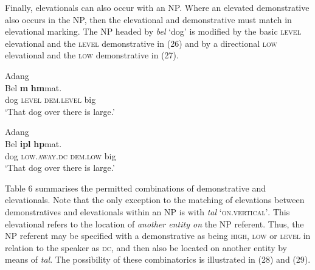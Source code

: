 Finally, elevationals can also occur with an NP. Where an elevated demonstrative also occurs in the NP, then the elevational and demonstrative must match in elevational marking. The NP headed by \textit{bel} `dog' is modified by the basic \textsc{level} elevational and the \textsc{level} demonstrative in (26) and by a directional \textsc{low} elevational and the \textsc{low} demonstrative in (27).



\ea%
\label{ex:26}
   Adang \citep[188]{Haan2001}   \\
\gll Bel  \textbf{{m}}\textbf{{{\textopeno}}}\textbf{{{\ng}}}  \textbf{{h}}\textbf{{{\textepsilon}}}\textbf{{m}}\textbf{{{\textopeno}}}{mat}{{\textepsilon}.}  \\
  dog  \textsc{level} \textsc{dem.level} big      \\
\glt   `That dog over there is large.'
\z








\ea%
\label{ex:27}
    Adang \citep[188]{Haan2001}  \\
\gll   Bel  \textbf{{ipl}}\textbf{{{\textepsilon}}} \textbf{{h}}\textbf{{{\textepsilon}p{\textopeno}}}{mat}{{\textepsilon}.} \\
    dog  \textsc{low.away.dc} \textsc{dem.low} big    \\
\glt   `That dog over there is large.'
\z







{Table 6 summarises the permitted combinations of demonstrative and elevationals. Note that the only exception to the matching of elevations between demonstratives and elevationals within an NP is with} \textit{tal}\textit{{\textepsilon}} `\textsc{on.vertical'}. This elevational refers to the location of \textit{another entity on} the NP referent. Thus, the NP referent may be specified with a demonstrative as being \textsc{high}, \textsc{low} or \textsc{level} in relation to the speaker as \textsc{dc}, and then also be located on another entity by means of \textit{tal}\textit{{\textepsilon}}. The possibility of these combinatorics is illustrated in (28) and (29).




